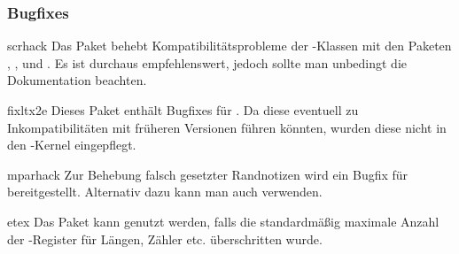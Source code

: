 \subsubsection{Bugfixes}
%
\begin{packages}
\item[scrhack]
  Das Paket behebt Kompatibilitätsprobleme der \KOMAScript-Klassen mit den 
  Paketen , ,  und
  . Es ist durchaus empfehlenswert, jedoch sollte man 
  unbedingt die Dokumentation beachten.
\item[fixltx2e]
  Dieses Paket enthält Bugfixes für . Da diese eventuell zu 
  Inkompatibilitäten mit früheren Versionen führen könnten, wurden diese nicht 
  in den -Kernel eingepflegt.
\item[mparhack]
  Zur Behebung falsch gesetzter Randnotizen wird ein Bugfix für 
   bereitgestellt. Alternativ dazu kann man auch 
   verwenden.
\item[etex]
  Das Paket kann genutzt werden, falls die standardmäßig maximale Anzahl der 
  -Register für Längen, Zähler etc. überschritten wurde.
\end{packages}